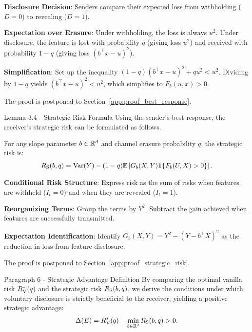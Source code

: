 \begin{guideblock}
\item \textbf{Disclosure Decision}: Senders compare their expected loss from withholding ($D=0$) to revealing ($D=1$).
\item \textbf{Expectation over Erasure}: Under withholding, the loss is always $u^2$. Under disclosure, the feature is lost with probability $q$ (giving loss $u^2$) and received with probability $1-q$ (giving loss $(b^\top x - u)^2$).
\item \textbf{Simplification}: Set up the inequality $(1-q)(b^\top x - u)^2 + q u^2 < u^2$. Dividing by $1-q$ yields $(b^\top x - u)^2 < u^2$, which simplifies to $F_b(u, x) > 0$.
\end{guideblock}
The proof is postponed to Section~\ref{app:proof_best_response}.

\begin{sourceblock}{Lemma 3.4 - Strategic Risk Formula}
Using the sender's best response, the receiver's strategic risk can be formulated as follows.
\begin{lemma}
\label{lem:strategic_risk_formula}
For any slope parameter $b \in \mathbb{R}^d$ and channel erasure probability $q$, the strategic risk is:
\begin{equation}
    \label{eq:strategic_risk_formula}
    R_{\mathrm{S}}(b, q) = \mathrm{Var}(Y) - (1 - q)\mathbb{E}\left[ G_b(X, Y) \mathbf{1}\{F_b(U, X) > 0\} \right].
\end{equation}
\end{lemma}
\end{sourceblock}

\begin{guideblock}
\item \textbf{Conditional Risk Structure}: Express risk as the sum of risks when features are withheld ($I_t = 0$) and when they are revealed ($I_t = 1$).
\item \textbf{Reorganizing Terms}: Group the terms by $Y^2$. Subtract the gain achieved when features are successfully transmitted.
\item \textbf{Expectation Identification}: Identify $G_b(X, Y) = Y^2 - (Y - b^\top X)^2$ as the reduction in loss from feature disclosure.
\end{guideblock}
The proof is postponed to Section~\ref{app:proof_strategic_risk}.

\begin{sourceblock}{Paragraph 6 - Strategic Advantage Definition}
By comparing the optimal vanilla risk $R_{\mathrm{V}}^*(q)$ and the strategic risk $R_{\mathrm{S}}(b, q)$, we derive the conditions under which voluntary disclosure is strictly beneficial to the receiver, yielding a positive strategic advantage:
\begin{equation}
    \label{eq:strategic_advantage_formula}
    \Delta(E) = R_{\mathrm{V}}^*(q) - \min_{b \in \mathbb{R}^d} R_{\mathrm{S}}(b, q) > 0.
\end{equation}
\end{sourceblock}

